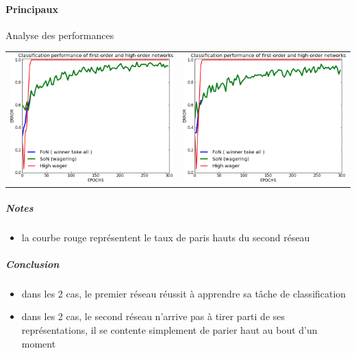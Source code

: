     \paragraph{Principaux}
      Analyse des performances
      \begin{center}
	\begin{tabular}{lr}
	  \hspace*{-1cm}
	  \includegraphics[width=250px]{data/expC3/perf_5.png}
	  &
	  \includegraphics[width=250px]{data/expC3/perf_100.png} 
	\end{tabular}
      \end{center}
      \subparagraph{Notes}
	\begin{itemize}
	  \item la courbe rouge représentent le taux de paris hauts du second réseau
	\end{itemize}
      \subparagraph{Conclusion}
	\begin{itemize}
	  \item dans les 2 cas, le premier réseau réussit à apprendre sa tâche de classification
	  \item dans les 2 cas, le second réseau n'arrive pas à tirer parti de ses représentations, 
	  il se contente simplement de parier haut au bout d'un moment
	\end{itemize}
